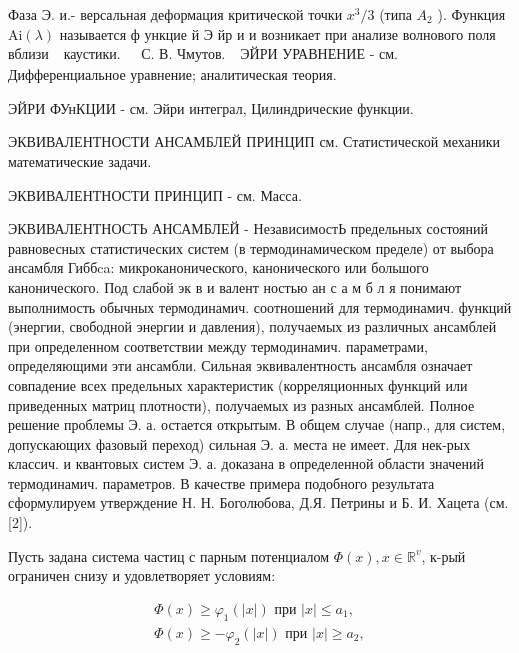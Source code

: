 \documentclass[10pt]{article}
\begin{document}
Фаза Э. и.- версальная деформация критической точки $x^{3} / 3$ (типа $A_{2}$ ). Функция $\mathrm{Ai}(\lambda)$ называется $ф$ ункцие й Э йр и и возникает при анализе волнового поля вблизи $\begin{array}{ll}\text { каустики. } & \text { С. В. Чмутов. }\end{array}$ ЭЙРИ УРАВНЕНИЕ - см. Дифференциальное уравнение; аналитическая теория.



ЭЙРИ ФУнКЦИИ - см. Эйри интеграл, Цилиндрические функции.



ЭКВИВАЛЕНТНОСТИ АНСАМБЛЕЙ ПРИНЦИП см. Статистической механики математические задачи.



ЭКВИВАЛЕНТНОСТИ ПРИНЦИП - см. Масса.



ЭКВИВАЛЕНТНОСТЬ АНСАМБЛЕЙ - НезависимостЬ предельных состояний равновесных статистических систем (в термодинамическом пределе) от выбора ансамбля Гиббca: микроканонического, канонического или большого канонического. Под слабой эк в и валент ностью ан с а м б л я понимают выполнимость обычных термодинамич. соотношений для термодинамич. функций (энергии, свободной энергии и давления), получаемых из различных ансамблей при определенном соответствии между термодинамич. параметрами, определяющими эти ансамбли. Сильная эквивалентность ансамбля означает совпадение всех предельных характеристик (корреляционных функций или приведенных матриц плотности), получаемых из разных ансамблей. Полное решение проблемы Э. а. остается открытым. В общем случае (напр., для систем, допускающих фазовый переход) сильная Э. а. места не имеет. Для нек-рых классич. и квантовых систем Э. а. доказана в определенной области значений термодинамич. параметров. В качестве примера подобного результата сформулируем утверждение Н. Н. Боголюбова, Д.Я. Петрины и Б. И. Хацета (см. [2]).



Пусть задана система частиц с парным потенциалом $\Phi(x), x \in \mathbb{R}^{v}$, к-рый ограничен снизу и удовлетворяет условиям:



\[

\begin{gathered}

\Phi(x) \geqslant \varphi_{1}(|x|) \text { при }|x| \leqslant a_{1}, \\

\Phi(x) \geqslant-\varphi_{2}(|x|) \text { при }|x| \geqslant a_{2},

\end{gathered}

\]
\end{document}
